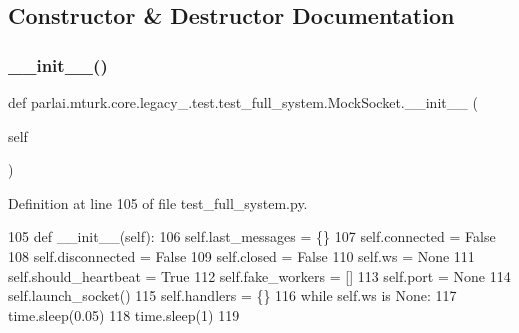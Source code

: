 \subsection{Constructor \& Destructor Documentation}
\mbox{\label{classparlai_1_1mturk_1_1core_1_1legacy__2018_1_1test_1_1test__full__system_1_1MockSocket_a4d744098fe9a3e3efee2a09fbaae41e0}} 
\subsubsection{\texorpdfstring{\+\_\+\+\_\+init\+\_\+\+\_\+()}{\_\_init\_\_()}}
{\footnotesize\ttfamily def parlai.\+mturk.\+core.\+legacy\+\_.\+test.\+test\+\_\+full\+\_\+system.\+Mock\+Socket.\+\_\+\+\_\+init\+\_\+\+\_\+ (\begin{DoxyParamCaption}\item[{}]{self }\end{DoxyParamCaption})}



Definition at line 105 of file test\+\_\+full\+\_\+system.\+py.


\begin{DoxyCode}
105     \textcolor{keyword}{def }\_\_init\_\_(self):
106         self.last\_messages = \{\}
107         self.connected = \textcolor{keyword}{False}
108         self.disconnected = \textcolor{keyword}{False}
109         self.closed = \textcolor{keyword}{False}
110         self.ws = \textcolor{keywordtype}{None}
111         self.should\_heartbeat = \textcolor{keyword}{True}
112         self.fake\_workers = []
113         self.port = \textcolor{keywordtype}{None}
114         self.launch\_socket()
115         self.handlers = \{\}
116         \textcolor{keywordflow}{while} self.ws \textcolor{keywordflow}{is} \textcolor{keywordtype}{None}:
117             time.sleep(0.05)
118         time.sleep(1)
119 
\end{DoxyCode}



